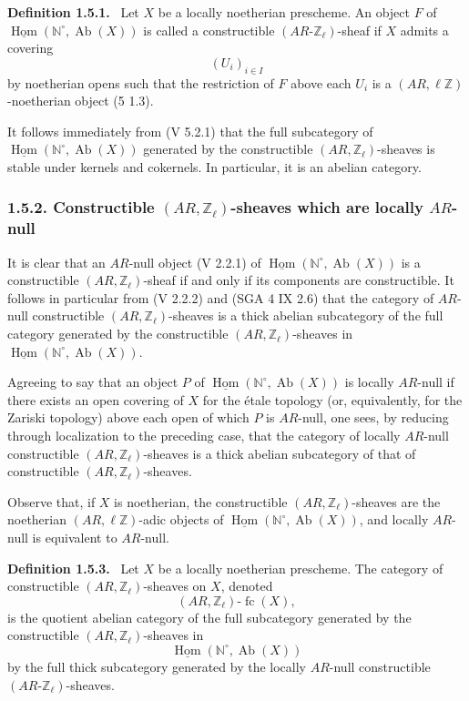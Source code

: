 \documentclass[11pt]{article}
\providecommand{\uHom}{\underline{\Hom}}
\newenvironment{statement}[1]{\par\medskip\noindent\textbf{#1.}\ }{\par\medskip}
\DeclareMathOperator{\Hom}{Hom}
\providecommand{\Hom}{\operatorname{Hom}}
\providecommand{\Ab}{\operatorname{Ab}}
\providecommand{\fc}{\operatorname{fc}}
\providecommand{\Ab}{\operatorname{Ab}}
\providecommand{\Hom}{\operatorname{Hom}}
\begin{document}
\begin{statement}{Definition 1.5.1}
Let \(X\) be a locally noetherian prescheme. An object \(F\) of \(\uHom(\mathbb N^\circ,\Ab(X))\) is called a constructible \((AR\text{-}\mathbb Z_\ell)\)-sheaf if \(X\) admits a covering
\[
(U_i)_{i\in I}
\]
by noetherian opens such that the restriction of \(F\) above each \(U_i\) is a \((AR,\ell\mathbb Z)\)-noetherian object (5 1.3).
\end{statement}

It follows immediately from (V 5.2.1) that the full subcategory of \(\uHom(\mathbb N^\circ,\Ab(X))\) generated by the constructible \((AR,\mathbb Z_\ell)\)-sheaves is stable under kernels and cokernels. In particular, it is an abelian category.

\subsubsection*{1.5.2. Constructible \((AR,\mathbb Z_\ell)\)-sheaves which are locally \(AR\)-null}

It is clear that an \(AR\)-null object (V 2.2.1) of \(\uHom(\mathbb N^\circ,\Ab(X))\) is a constructible \((AR,\mathbb Z_\ell)\)-sheaf if and only if its components are constructible. It follows in particular from (V 2.2.2) and (SGA 4 IX 2.6) that the category of \(AR\)-null constructible \((AR,\mathbb Z_\ell)\)-sheaves is a thick abelian subcategory of the full category generated by the constructible \((AR,\mathbb Z_\ell)\)-sheaves in \(\uHom(\mathbb N^\circ,\Ab(X))\).

Agreeing to say that an object \(P\) of \(\uHom(\mathbb N^\circ,\Ab(X))\) is locally \(AR\)-null if there exists an open covering of \(X\) for the étale topology (or, equivalently, for the Zariski topology) above each open of which \(P\) is \(AR\)-null, one sees, by reducing through localization to the preceding case, that the category of locally \(AR\)-null constructible \((AR,\mathbb Z_\ell)\)-sheaves is a thick abelian subcategory of that of constructible \((AR,\mathbb Z_\ell)\)-sheaves.

Observe that, if \(X\) is noetherian, the constructible \((AR,\mathbb Z_\ell)\)-sheaves are the noetherian \((AR,\ell\mathbb Z)\)-adic objects of \(\uHom(\mathbb N^\circ,\Ab(X))\), and locally \(AR\)-null is equivalent to \(AR\)-null.

\begin{statement}{Definition 1.5.3}
Let \(X\) be a locally noetherian prescheme. The category of constructible \((AR,\mathbb Z_\ell)\)-sheaves on \(X\), denoted
\[
(AR,\mathbb Z_\ell)\text{-}\fc(X),
\]
is the quotient abelian category of the full subcategory generated by the constructible \((AR,\mathbb Z_\ell)\)-sheaves in
\[
\uHom(\mathbb N^\circ,\Ab(X))
\]
by the full thick subcategory generated by the locally \(AR\)-null constructible \((AR\text{-}\mathbb Z_\ell)\)-sheaves.
\end{statement}
\end{document}
